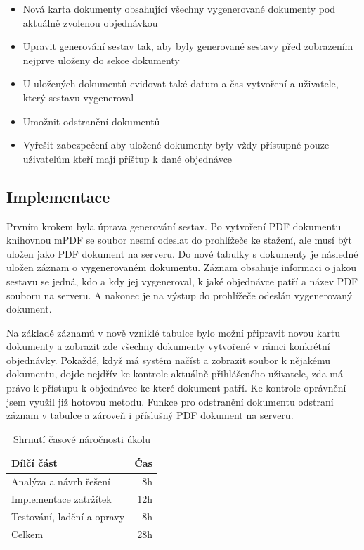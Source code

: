 \begin{itemize}
    \item Nová karta dokumenty obsahující všechny vygenerované dokumenty pod aktuálně zvolenou objednávkou
    \item Upravit generování sestav tak, aby byly generované sestavy před zobrazením nejprve uloženy do sekce dokumenty
    \item U uložených dokumentů evidovat také datum a čas vytvoření a uživatele, který sestavu vygeneroval
    \item Umožnit odstranění dokumentů
    \item Vyřešit zabezpečení aby uložené dokumenty byly vždy přístupné pouze uživatelům kteří mají příštup k dané objednávce
\end{itemize}

\subsection{Implementace}

Prvním krokem byla úprava generování sestav. Po vytvoření PDF dokumentu knihovnou mPDF se soubor nesmí odeslat do prohlížeče ke stažení, ale musí být uložen jako PDF dokument 
na serveru. Do nové tabulky s dokumenty je následné uložen záznam o vygenerovaném dokumentu. Záznam obsahuje informaci o jakou sestavu se jedná, kdo a kdy jej vygeneroval, k jaké objednávce patří a název PDF souboru na serveru. A nakonec je na výstup do prohlížeče odeslán vygenerovaný dokument.

Na základě záznamů v nově vzniklé tabulce bylo možní připravit novou kartu dokumenty a zobrazit zde všechny dokumenty vytvořené v rámci konkrétní objednávky. Pokaždé, když má systém načíst a zobrazit soubor k nějakému dokumentu, dojde nejdřív ke kontrole aktuálně přihlášeného uživatele, zda má právo k přístupu k objednávce ke které dokument patří. Ke kontrole oprávnění jsem využil již hotovou metodu. Funkce pro odstranění dokumentu odstraní záznam v tabulce a zároveň i příslušný PDF dokument na serveru. 


\begin{table}
	\centering
	\caption[Časová náročnost úkolu na dokumenty]{Shrnutí časové náročnosti úkolu}
	\label{tab:TopLevelTableLabel}
	{
		\begin{tabular}{lr}
			\toprule
			Dílčí část & Čas\\
			\midrule
			Analýza a návrh řešení & 8h \\
			Implementace zatržítek & 12h \\
            Testování, ladění a opravy & 8h \\
            \midrule
            Celkem  & 28h \\
			\midrule
		\end{tabular}
	}
\end{table}


